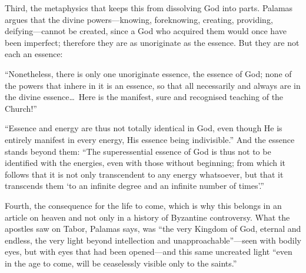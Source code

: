 Third, the metaphysics that keeps this from dissolving God into parts. Palamas argues that the divine powers---knowing, foreknowing, creating, providing, deifying---cannot be created, since a God who acquired them would once have been imperfect; therefore they are as unoriginate as the essence. But they are not each an essence:

\begin{studyframe}
``Nonetheless, there is only one unoriginate essence, the essence of God; none of the powers that inhere in it is an essence, so that all necessarily and always are in the divine essence\ldots\ Here is the manifest, sure and recognised teaching of the Church!''
\end{studyframe}

``Essence and energy are thus not totally identical in God, even though He is entirely manifest in every energy, His essence being indivisible.'' And the essence stands beyond them: ``The superessential essence of God is thus not to be identified with the energies, even with those without beginning; from which it follows that it is not only transcendent to any energy whatsoever, but that it transcends them `to an infinite degree and an infinite number of times'.''

Fourth, the consequence for the life to come, which is why this belongs in an article on heaven and not only in a history of Byzantine controversy. What the apostles saw on Tabor, Palamas says, was ``the very Kingdom of God, eternal and endless, the very light beyond intellection and unapproachable''---seen with bodily eyes, but with eyes that had been opened---and this same uncreated light ``even in the age to come, will be ceaselessly visible only to the saints.''

